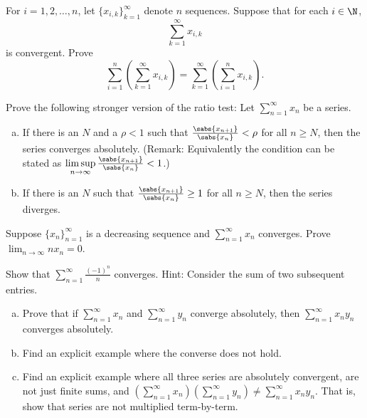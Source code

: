 \begin{exercise}
For $i=1,2,\ldots,n$, let $\{ x_{i,k} \}_{k=1}^\infty$ denote $n$
sequences.  Suppose that for each $i \in \N$,
\begin{equation*}
\sum_{k=1}^\infty x_{i,k}
\end{equation*}
is convergent.  Prove
\begin{equation*}
\sum_{i=1}^n \left( \sum_{k=1}^\infty x_{i,k} \right)
=
\sum_{k=1}^\infty \left( \sum_{i=1}^n x_{i,k} \right) .
\end{equation*}
\end{exercise}

\begin{exercise} \label{exercise:strongerratiotest}
Prove the following stronger version of the ratio test:
Let $\sum_{n=1}^\infty x_n$ be a series.
\begin{enumerate}[a)]
\item
If there is an $N$ and a $\rho < 1$ such that
$\frac{\sabs{x_{n+1}}}{\sabs{x_n}} < \rho$ for all $n \geq N$,
then the series converges absolutely.
(Remark: Equivalently the condition can be stated as
$\limsup\limits_{n\to\infty} \frac{\sabs{x_{n+1}}}{\sabs{x_n}} < 1$.)
\item
If there is an $N$ such that
$\frac{\sabs{x_{n+1}}}{\sabs{x_n}} \geq 1$
for all $n \geq N$,
then the series diverges. 
\end{enumerate}
\end{exercise}

\begin{exercise}[Challenging]
Suppose $\{ x_n \}_{n=1}^\infty$ is a decreasing sequence and
$\sum_{n=1}^\infty x_n$ converges.
Prove $\displaystyle \lim_{n\to\infty} n x_n = 0$.
\end{exercise}

\begin{exercise}
Show that $\displaystyle \sum_{n=1}^\infty \frac{{(-1)}^n}{n}$ converges.
Hint: Consider the sum of two subsequent entries.
\end{exercise}

\begin{exercise}
\leavevmode
\begin{enumerate}[a)]
\item Prove that if $\sum_{n=1}^\infty x_n$ and $\sum_{n=1}^\infty y_n$ converge absolutely, then
$\sum_{n=1}^\infty x_ny_n$ converges absolutely.
\item Find an explicit example where the converse does not hold.
\item Find an explicit example where all three series are absolutely convergent,
are not just finite sums,
and $\left(\sum_{n=1}^\infty x_n\right)\left(\sum_{n=1}^\infty y_n\right)
\not= \sum_{n=1}^\infty x_ny_n$.  That is, show that series are
not multiplied term-by-term.
\end{enumerate}
\end{exercise}

